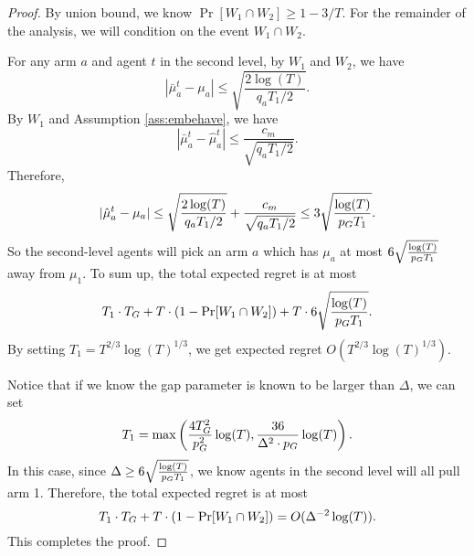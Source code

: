 \begin{proof}
By union bound, we know $\Pr[W_1 \cap W_2] \geq 1 - 3/T$. For the
remainder of the analysis, we will condition on the event
$W_1 \cap W_2$.

For any arm $a$ and agent $t$ in the second level, by $W_1$ and $W_2$, we have
\[
|\bar{\mu}^t_a - \mu_a| \leq \sqrt{\frac{2\log(T)}{q_aT_1 /2}}.
\]
By $W_1$ and Assumption \ref{ass:embehave}, we have
\[
|\bar{\mu}^t_a - \hat{\mu}^t_a| \leq \frac{c_m}{\sqrt{q_aT_1/2}}.
\]
Therefore,
\[
|\hat{\mu}^t_a - \mu_a|\leq \sqrt{\frac{2\log(T)}{q_aT_1 /2}}+\frac{c_m}{\sqrt{q_aT_1/2}} \leq 3 \sqrt{\frac{\log(T)}{p_G T_1 }}.
\]
So the second-level agents will pick an arm $a$ which has $\mu_a$ at most $6 \sqrt{\frac{\log(T)}{p_G T_1 }}$ away from $\mu_1$. To sum up, the total expected regret is at most 
\[
T_1 \cdot T_G + T \cdot (1-\Pr[W_1 \cap W_2]) + T \cdot  6 \sqrt{\frac{\log(T)}{p_G T_1 }}.
\]
By setting $T_1 = T^{2/3}\log(T)^{1/3}$, we get expected regret $O(T^{2/3}\log(T)^{1/3})$.

Notice that if we know the gap parameter is known to be larger than
$\Delta$, we can set
\[
T_1 = \max\left( \frac{4T_G^2}{p_G^2}\log(T), \frac{36 }{\Delta^2 \cdot p_G} \log(T) \right).
\]
In this case, since $\Delta \geq 6 \sqrt{\frac{\log(T)}{p_G T_1 }}$, we know agents in the second level will all pull arm 1. Therefore, the total expected regret is at most
\[
T_1 \cdot T_G + T \cdot (1- \Pr[W_1 \cap W_2]) = O(\Delta^{-2} \log(T)).
\]
This completes the proof.
\end{proof}
